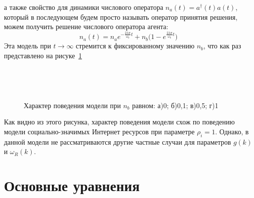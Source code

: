 а также свойство для динамики числового оператора $n_{a}(t) = a^{\dagger}(t) a(t)$, который в последующем
будем просто называть оператор принятия решения, можем получить решение числового оператора агента:
\begin{equation}\label{na_bagarello}
    n_{a}(t) = n_{a} e^{- \frac{2 \lambda \pi}{\omega_{b}} t} + n_{b} \Biggl( 1 - e^{\frac{2 \lambda \pi}{\omega_{b}} t} \Biggr)
\end{equation}
Эта модель при $ t \rightarrow \infty$ стремится к фиксированному значению $n_{b}$, что как раз
представлено на рисуке~\ref{fig:at_baga}
\begin{figure}[h!]
    \captionsetup{justification=centering}
    \begin{minipage}[h]{0.49\linewidth}
         \\
    \end{minipage}
    \begin{minipage}[h]{0.49\linewidth}
    \end{minipage}
    \begin{minipage}[h]{0.49\linewidth}
         \\
    \end{minipage}
    \begin{minipage}[h]{0.49\linewidth}
    \end{minipage}
    \caption{Характер поведения модели при $n_{b}$ равном: а)0; б)0,1; в)0,5; г)1}
    \label{fig:at_baga}
\end{figure}

Как видно из этого рисунка, характер поведения модели схож по поведению модели социально-значимых
Интернет ресурсов при параметре $\rho_{i} = 1$.
Однако, в данной модели не рассматриваются другие частные случаи для параметров $g(k)$ и $\omega_{R}(k)$.

\section{Основные уравнения}

